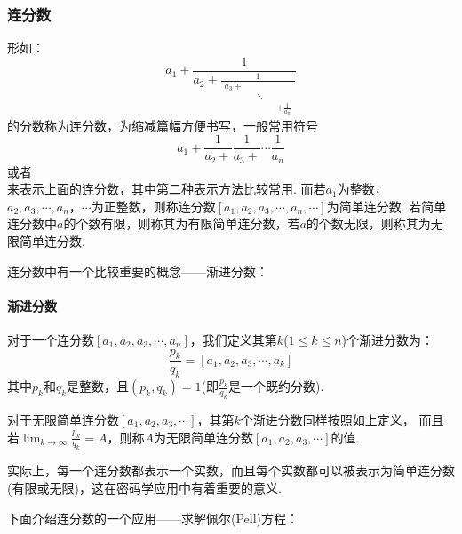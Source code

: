\documentclass{article}
\numberwithin{equation}{subsubsection}
\begin{document}
\subsubsection{连分数}
形如：
\begin{equation}
    a_1+\frac{1}{a_2+\frac{1}{\begin{matrix}a_3+\\&&\ddots\\&&&&+\frac{1}{a_n}\end{matrix}}}
    \nonumber
\end{equation}
的分数称为连分数，为缩减篇幅方便书写，一般常用符号
\begin{equation}
    a_1+\frac{1}{a_2+}\frac{1}{a_3+}\cdots\frac{1}{a_n}
    \nonumber
\end{equation}
或者
\begin{equation}
    [a_1,a_2,a_3,\cdots,a_n]
    \nonumber
\end{equation}
来表示上面的连分数，其中第二种表示方法比较常用.
而若$a_1$为整数，$a_2,a_3,\cdots,a_n，\cdots$为正整数，则称连分数$[a_1,a_2,a_3,\cdots,a_n,\cdots]$为简单连分数.
若简单连分数中$a$的个数有限，则称其为有限简单连分数，若$a$的个数无限，则称其为无限简单连分数.\par
连分数中有一个比较重要的概念——渐进分数：
\paragraph{\textbf{渐进分数}}
对于一个连分数$[a_1,a_2,a_3,\cdots,a_n]$，我们定义其第$k$($1\le k\le n$)个渐进分数为：
\begin{equation}
    \frac{p_k}{q_k}=[a_1,a_2,a_3,\cdots,a_k]
    \nonumber
\end{equation}
其中$p_k$和$q_k$是整数，且$(p_k,q_k)=1$(即$\frac{p_k}{q_k}$是一个既约分数).\par
对于无限简单连分数$[a_1,a_2,a_3,\cdots]$，其第$k$个渐进分数同样按照如上定义，
而且若$\lim_{k\to\infty}\frac{p_k}{q_k}=A$，则称$A$为无限简单连分数$[a_1,a_2,a_3,\cdots]$的值.\par
实际上，每一个连分数都表示一个实数，而且每个实数都可以被表示为简单连分数(有限或无限)，这在密码学应用中有着重要的意义.\par
下面介绍连分数的一个应用——求解佩尔(Pell)方程：\par
\end{document}
